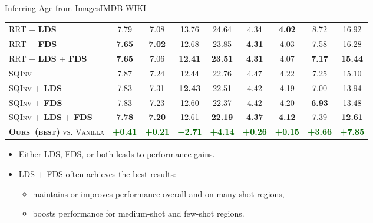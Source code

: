 \begin{frame}{Inferring Age from Images}{IMDB-WIKI}
\begin{table}[t]
\begin{center}
{\begin{tabular}{l|cccc|cccc}
					\textsc{RRT} + \textbf{\textsc{LDS}} & {7.79} &  7.08  & {13.76}  & {24.64} & {4.34} & \textbf{4.02} & {8.72} & {16.92} \\[1.2pt]
					\textsc{RRT} + \textbf{\textsc{FDS}}   & \textbf{7.65}  & \textbf{7.02} & 12.68 & 23.85 & \textbf{4.31} & 4.03 & 7.58 & 16.28 \\[1.2pt]
					\textsc{RRT} + \textbf{\textsc{LDS}} + \textbf{\textsc{FDS}}   & \textbf{7.65}  & 7.06  & \textbf{12.41}  & \textbf{23.51}  & \textbf{4.31} & {4.07} & \textbf{7.17} & \textbf{15.44} \\ \midrule\midrule
					\textsc{SQInv}      & 7.87 & 7.24 & 12.44  & 22.76 & 4.47 & 4.22 & 7.25   & 15.10 \\[1.2pt]
					\textsc{SQInv} + \textbf{\textsc{LDS}} & {7.83} & 7.31 & \textbf{12.43}  & {22.51} & {4.42} & {4.19} & {7.00}  & {13.94} \\[1.2pt]
					\textsc{SQInv} + \textbf{\textsc{FDS}}   & 7.83 & 7.23 & 12.60  & 22.37  & 4.42 & 4.20 & \textbf{6.93} & 13.48  \\[1.2pt]
					\textsc{SQInv} + \textbf{\textsc{LDS}} + \textbf{\textsc{FDS}}   & \textbf{7.78} & \textbf{7.20} & {12.61} & \textbf{22.19} & \textbf{4.37}    & \textbf{4.12} & 7.39  & \textbf{12.61}  \\ \midrule\midrule
					\textsc{\textbf{Ours~(best)} vs. Vanilla}   & \textcolor{darkgreen}{\textbf{+0.41}} & \textcolor{darkgreen}{\textbf{+0.21}} & \textcolor{darkgreen}{\textbf{+2.71}} & \textcolor{darkgreen}{\textbf{+4.14}} & \textcolor{darkgreen}{\textbf{+0.26}} & \textcolor{darkgreen}{\textbf{+0.15}} & \textcolor{darkgreen}{\textbf{+3.66}} & \textcolor{darkgreen}{\textbf{+7.85}} \\
					\bottomrule[1.5pt]
				\end{tabular}
			}
		\end{center}
	\end{table}
	\begin{itemize}\fontsize{7pt}{7.2}\selectfont
		\item Either LDS, FDS, or both leads to performance gains.
		\item LDS + FDS often achieves the best results:
		\begin{itemize}\fontsize{7pt}{7.2}\selectfont
			\item maintains or improves performance overall
			and on many-shot regions,
			\item boosts performance for medium-shot and few-shot regions.
		\end{itemize}
	\end{itemize}
\end{frame}

